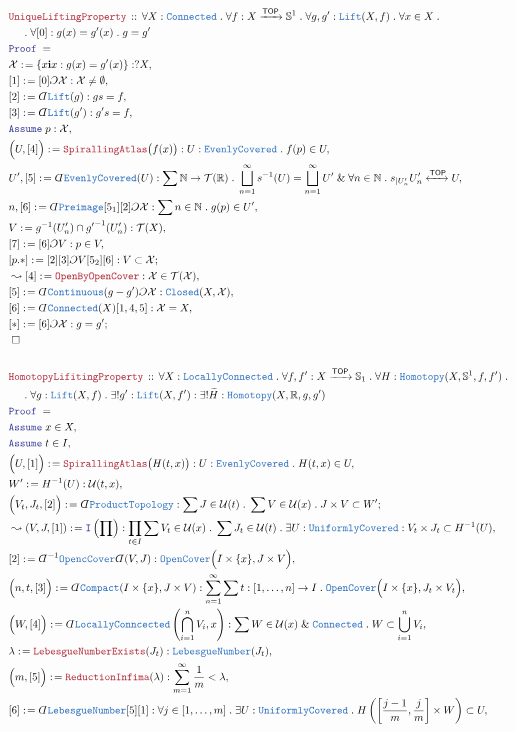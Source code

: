 \documentclass[12pt]{scrartcl}
\newcommand{\TYPE}[1]{\textcolor{NavyBlue}{\mathtt{#1}}}
\newcommand{\LOGIC}[1]{\textcolor{Blue}{\mathtt{#1}}}
\newcommand{\THM}[1]{\textcolor{Maroon}{\mathtt{#1}}}
\renewcommand{\.}{\; . \;}
\newcommand{\de}{: \kern 0.1pc =}
\newcommand{\Act}[1]{\left( #1 \right)}
\newcommand{\Theorem}[2]{& \THM{#1} \, :: \, #2 \\ & \Proof = \\ }
\newcommand{\NewLine}{\\ & \kern 1pc}
\newcommand{\Page}[1]{ \begin{align*} #1 \end{align*}   }
\newcommand{ \bd }{ \ByDef }
\renewcommand{\And}{\; \& \;}
\newcommand{\Intro}{\LOGIC{I}}
\newcommand{\Reals}{\mathbb{R} }
\newcommand{\Sphere}{\mathbb{S}}
\newcommand{\Nat}{\mathbb{N} }
\newcommand{\ToIso}{\xleftrightarrow}
\newcommand{\Arrow}{\xrightarrow}
\renewcommand{\i}{\mathbf{i}}
\newcommand{\Say}[3]{& #1 \de #2 : #3, \\}
\newcommand{\Conclude}[3]{& #1 \de #2 : #3; \\}
\newcommand{\Derive}[3]{& \leadsto #1 \de #2 : #3, \\}
\newcommand{\Assume}[2]{& \LOGIC{Assume} \; #1 : #2, \\}
\newcommand{\AssumeIn}[2]{& \LOGIC{Assume} \; #1 \in #2, \\}
\newcommand{\QED}{\; \square}
\newcommand{\EndProof}{& \QED \\}
\newcommand{\ByDef}{\rotatebox[origin=c]{-180}{$D$}}%
\newcommand{\ByConstr}{\rotatebox[origin=c]{-180}{$C$}}%
\newcommand{\Proof}{\LOGIC{Proof} \; }
\newcommand{\TOP}{\mathsf{TOP}}
\newcommand{\T}{\mathcal{T}}
\newcommand{\U}{\mathcal{U}}
\newcommand{\X}{\mathcal{X}}
\begin{document}
\Page{
	\Theorem{UniqueLiftingProperty}
	{
		\forall X : \TYPE{Connected} \.
		\forall f : X  \Arrow{\TOP} \Sphere^1 \.
		\forall g,g' : \TYPE{Lift}(X,f) \. 
		\forall x \in X \. \NewLine \.
		\forall [0] : g(x) = g'(x) \.
		g = g'
	}
	\Say{\X}{ \{ x \i x  : g(x) = g'(x)  \} }{?X}
	\Say{[1]}{[0]\ByConstr \X }{\X \neq \emptyset}
	\Say{[2]}{\bd \TYPE{Lift}(g)}{ g s = f }
	\Say{[3]}{\bd \TYPE{Lift}(g')}{ g' s = f }
	\Assume{p}{\X}
	\Say{\Big(U,[4]\Big)}{\THM{SpirallingAtlas}\big(f(x)\big)}
	{
		U : \TYPE{EvenlyCovered} \. f(p) \in U
	}
	\Say{U',[5]}{\bd \TYPE{EvenlyCovered}(U)}
	{
		\sum \Nat \to \T(\Reals) \. 
		\bigsqcup^\infty_{n=1} 
		s^{-1}(U) = \bigsqcup^\infty_{n=1} U' \And
		\forall n \in \Nat \. s_{|U'_n} U'_n \ToIso{\TOP} U
	}
	\Say{n,[6]}{\bd \TYPE{Preimage}[5_1][2]\ByConstr \X }
	{
		\sum n \in \Nat \.   g(p) \in U'
	}
	\Say{V}{g^{-1}(U'_n) \cap {g'}^{-1}(U'_n)}{\T(X)}
	\Say{[7]}{[6]\ByConstr V}{ p \in V}
	\Conclude{[p.*]}{[2][3]\ByConstr V [5_2][6]}
	{
		V \subset \X
	}
	\Derive{[4]}{\THM{OpenByOpenCover}}{\X \in \T(\X)}
	\Say{[5]}{\bd \TYPE{Continuous} (g - g')\ByConstr \X}{\TYPE{Closed}(X,\X)}
	\Say{[6]}{\bd \TYPE{Connected}(X)[1,4,5] }{\X = X}
	\Conclude{[*]}{[6]\ByConstr \X}{g = g'}
	\EndProof
	\\
	\Theorem{HomotopyLifitingProperty}
	{
		\forall X : \TYPE{LocallyConnected} \.
		\forall f,f' : X \Arrow{\TOP} \Sphere_1 \.
		\forall H : \TYPE{Homotopy}(X,\Sphere^1,f,f') \. \NewLine \. 
		\forall g : \TYPE{Lift}(X,f) \. 
		\exists! g' : \TYPE{Lift}(X,f') :
		\exists! \widetilde{H} : \TYPE{Homotopy}(X,\Reals,g,g')
	}
	\AssumeIn{x}{X}
	\AssumeIn{t}{I}
	\Say{\Big(U,[1]\Big)}{\THM{SpirallingAtlas}\big(H(t,x)\big)}
	{
		U : \TYPE{EvenlyCovered} \. H(t,x) \in U
	}
	\Say{W'}{H^{-1}(U)}{\U(t,x)}
	\Conclude{\Big( V_t,J_t,[2]\Big)}{\bd \TYPE{ProductTopology}}
	{
		\sum J \in \U(t) \.
		\sum V \in \U(x) \.
		J \times V \subset W'
	}
	\Derive{(V,J,[1])}{\Intro\Act{\prod}}
	{
		\prod_{t \in I} \sum V_t \in \U(x) \. \sum J_t \in \U(t) \. 
		\exists U : \TYPE{UniformlyCovered} :
		V_t \times J_t \subset H^{-1}(U)
	}
	\Say{[2]}{ \bd^{-1} \TYPE{OpencCover} \bd (V,J)  }
	{
		\TYPE{OpenCover}\Big(I\times\{x\},J \times V\Big)
	}
	\Say{\Big(n,t,[3]\Big)}{\bd \TYPE{Compact}(I \times \{x\},J \times V )}
	{
		\sum_{n=1}^\infty \sum t : [1,\ldots,n] \to I \.   \TYPE{OpenCover}\Big( I \times \{x\}, J_t \times V_t \Big)
	}	
	\Say{\Big(W,[4]\Big)}{\bd \TYPE{LocallyConncected}\left( \bigcap^n_{i=1} V_i , x \right)}
	{
		\sum W \in \U(x) \And \TYPE{Connected}  \.    
		W \subset \bigcup^n_{i=1} V_i 
	}
	\Say{\lambda}{\THM{LebesgueNumberExists}(J_t)}{\TYPE{LebesgueNumber}(J_t)}
	\Say{\Big(m,[5]\Big)}{\THM{ReductionInfima}(\lambda)}{\sum^\infty_{m=1} \frac{1}{m} < \lambda}
	\Say{[6]}{ \bd \TYPE{LebesgueNumber} [5][1]  }
	{
		\forall j \in [1,\ldots,m] \. 
		\exists U : \TYPE{UniformlyCovered} \.
		H\left( \left[ \frac{j-1}{m},\frac{j}{m} \right] \times W \right) \subset U
	}
}
\end{document}
